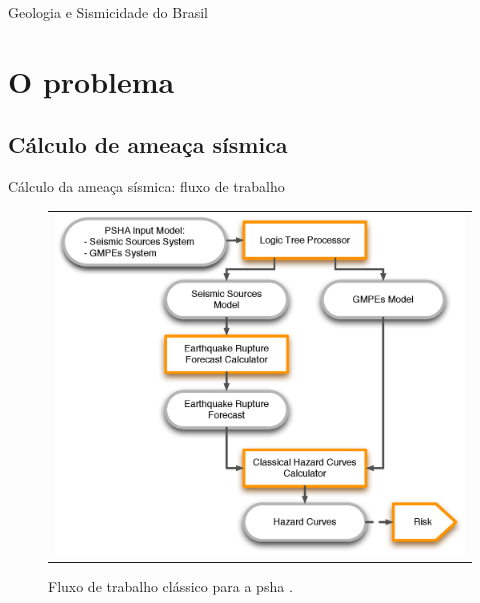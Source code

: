 \documentclass[ucs,8pt]{beamer}
\begin{document}
\begin{frame}{Geologia e Sismicidade do Brasil}
\begin{figure}[H]
\begin{subfigure}[t]{0.48\textwidth}
	  \label{fig:br_seis} 
	\end{subfigure}
	\label{fig:eq_record}
\end{figure}
\end{frame}



\section{O problema}
\subsection{Cálculo de ameaça sísmica}
\begin{frame}{Cálculo da ameaça sísmica: fluxo de trabalho}
\begin{figure}[H]
	\centering
	\begin{tabular}{l}
	\includegraphics[height=0.90\textheight]{classical_psha_workflow}
	\end{tabular}
	\caption{Fluxo de trabalho clássico para a \gls{psha} \citep{crowley_2013}.}
\label{fig:classical_psha}
\end{figure}
\end{frame}
\end{document}

